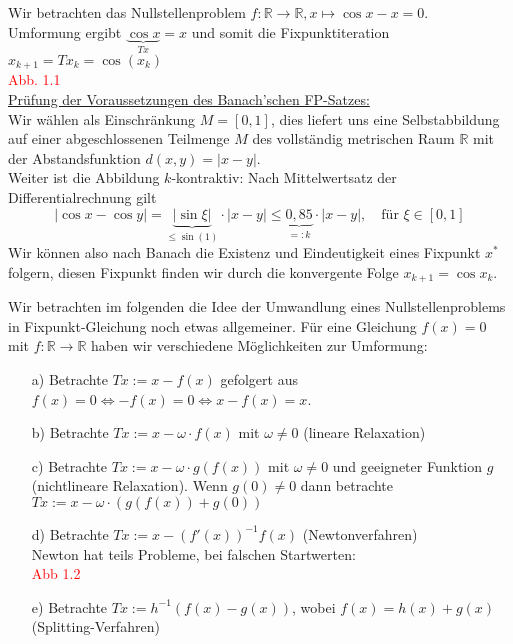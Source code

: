 \documentclass{article}
\begin{document}
\begin{egbox} 
    Wir betrachten das Nullstellenproblem $f:\mathbb{R}\rightarrow\mathbb{R}, x\mapsto \cos x - x = 0$. \\
    Umformung ergibt $\underbrace{\cos x}_{Tx} = x$ und somit die Fixpunktiteration $x_{k+1}=Tx_k=\cos(x_k)$ \\
    \textcolor{red}{Abb. 1.1} \\
    \underline{Prüfung der Voraussetzungen des Banach'schen FP-Satzes:} \\
    Wir wählen als Einschränkung $M=[0,1]$, dies liefert uns eine Selbstabbildung auf einer abgeschlossenen 
    Teilmenge $M$ des vollständig metrischen Raum $\mathbb{R}$ mit der Abstandsfunktion $ d(x,y) = |x-y|$. \\
    Weiter ist die Abbildung $k$-kontraktiv:  Nach Mittelwertsatz der Differentialrechnung gilt 
    \[|\cos x - \cos y| = \underbrace{|\sin \xi|}_{\leq \sin(1)}\cdot|x-y|\leq \underbrace{0,85}_{=:k}\cdot |x-y|, 
    \quad \text{für } \xi\in[0,1]\]
    Wir können also nach Banach die Existenz und Eindeutigkeit eines Fixpunkt $x^*$ folgern, diesen Fixpunkt 
    finden wir durch die konvergente Folge $x_{k+1}=\cos x_k$. 
\end{egbox}
Wir betrachten im folgenden die Idee der Umwandlung eines Nullstellenproblems in Fixpunkt-Gleichung noch etwas 
allgemeiner. Für eine Gleichung $f(x)=0$ mit $f:\mathbb{R}\rightarrow\mathbb{R}$ haben wir verschiedene Möglichkeiten 
zur Umformung:\\
\begin{enumerate}
    \item[a)] Betrachte $Tx := x-f(x)$ gefolgert aus $f(x)=0\Leftrightarrow -f(x)=0 \Leftrightarrow x-f(x)=x$.
    \item[b)] Betrachte $Tx := x-\omega \cdot f(x)$ mit $\omega\neq 0$ (lineare Relaxation)
    \item[c)] Betrachte $Tx:=x-\omega \cdot g(f(x))$ mit $\omega \neq 0$ und geeigneter Funktion $g$ 
    (nichtlineare Relaxation). Wenn $g(0)\neq 0$ dann betrachte $Tx:=x-\omega\cdot(g(f(x))+g(0))$
    \item[d)] Betrachte $Tx:=x-(f'(x))^{-1} f(x)$ (Newtonverfahren) \\
    Newton hat teils Probleme, bei falschen Startwerten: \\
    \textcolor{red}{Abb 1.2}
    \item[e)] Betrachte $Tx:=h^{-1}(f(x)-g(x))$, wobei $f(x)=h(x)+g(x)$ (Splitting-Verfahren) 
\end{enumerate}
\end{document}
